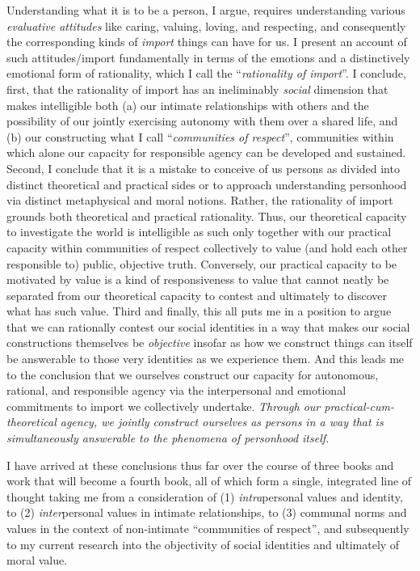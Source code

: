 \documentclass[%
  11pt,%
]{article}
\begin{document}
Understanding what it is to be a person, I argue, requires understanding various \emph{evaluative attitudes} like caring, valuing, loving, and respecting, and consequently the corresponding kinds of \emph{import} things can have for us. I present an account of such attitudes\slash import fundamentally in terms of the emotions and a distinctively emotional form of rationality, which I call the \enquote{\emph{rationality of import}}. I conclude, first, that the rationality of import has an ineliminably \emph{social} dimension that makes intelligible both (a) our intimate relationships with others and the possibility of our jointly exercising autonomy with them over a shared life, and (b) our constructing what I call \enquote{\emph{communities of respect}}, communities within which alone our capacity for responsible agency can be developed and sustained. Second, I conclude that it is a mistake to conceive of us persons as divided into distinct theoretical and practical sides or to approach understanding personhood via distinct metaphysical and moral notions. Rather, the rationality of import grounds both theoretical and practical rationality. Thus, our theoretical capacity to investigate the world is intelligible as such only together with our practical capacity within communities of respect collectively to value (and hold each other responsible to) public, objective truth. Conversely, our practical capacity to be motivated by value is a kind of responsiveness to value that cannot neatly be separated from our theoretical capacity to contest and ultimately to discover what has such value. Third and finally, this all puts me in a position to argue that we can rationally contest our social identities in a way that makes our social constructions themselves be \emph{objective} insofar as how we construct things can itself be answerable to those very identities as we experience them. And this leads me to the conclusion that we ourselves construct our capacity for autonomous, rational, and responsible agency via the interpersonal and emotional commitments to import we collectively undertake. \emph{Through our practical-cum-theoretical agency, we jointly construct ourselves as persons in a way that is simultaneously answerable to the phenomena of personhood itself.}

I have arrived at these conclusions thus far over the course of three books and work that will become a fourth book, all of which form a single, integrated line of thought taking me from a consideration of (1) \emph{intra}personal values and identity, to (2) \emph{inter}personal values in intimate relationships, to (3) communal norms and values in the context of non-intimate \enquote{communities of respect}, and subsequently to my current research into the objectivity of social identities and ultimately of moral value.
\end{document}
